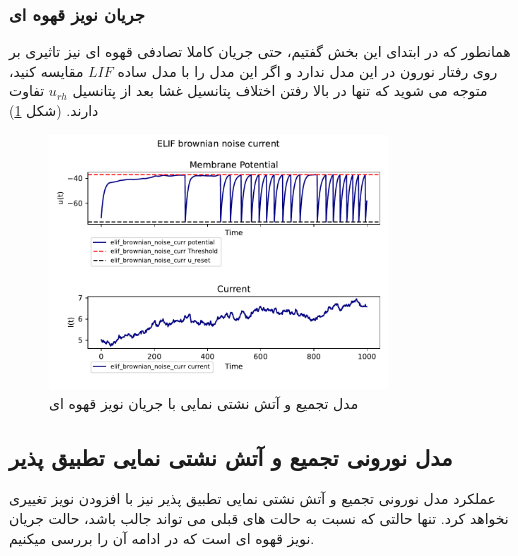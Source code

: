 \documentclass{article}
\begin{document}
            \subsubsection{جریان نویز قهوه ای}
                همانطور که در ابتدای این بخش گفتیم، حتی جریان کاملا تصادفی قهوه ای نیز تاثیری بر روی رفتار نورون در این مدل ندارد و اگر این مدل را با مدل ساده 
                $LIF$ 
                مقایسه کنید، متوجه می شوید که تنها در بالا رفتن اختلاف پتانسیل غشا بعد از پتانسیل 
                $u_{rh}$ 
                تفاوت دارند.
                (شکل \ref{fig:elif-brownian-noise-curr})
                \begin{figure}[H]
                    \centering
                    \includegraphics[width=0.8\textwidth]{plots/ELIF brownian noise current.pdf} 
                    \caption{مدل تجمیع و آتش نشتی نمایی با جریان نویز قهوه ای  }
                    \label{fig:elif-brownian-noise-curr}
                \end{figure}
        \subsection{مدل نورونی تجمیع و آتش نشتی نمایی تطبیق پذیر}
            عملکرد مدل نورونی تجمیع و آتش نشتی نمایی تطبیق پذیر نیز با افزودن نویز تغییری نخواهد کرد. تنها حالتی که نسبت به حالت های قبلی می تواند جالب باشد، حالت جریان نویز قهوه ای است که در ادامه آن را بررسی میکنیم.
\end{document}
